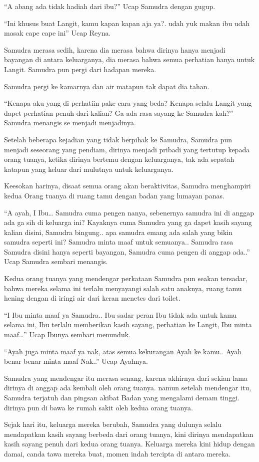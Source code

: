 “A abang ada tidak hadiah dari ibu?” Ucap Samudra dengan gugup.


“Ini khusus buat Langit, kamu kapan kapan aja ya?. udah yuk makan ibu udah masak cape cape ini” Ucap Reyna.


Samudra merasa sedih, karena dia merasa bahwa dirinya hanya menjadi bayangan di antara keluarganya, dia merasa bahwa semua perhatian hanya untuk Langit. Samudra pun pergi dari hadapan mereka.


Samudra pergi ke kamarnya dan air matapun tak dapat dia tahan.


“Kenapa aku yang di perhatiin pake cara yang beda? Kenapa selalu Langit yang dapet perhatian penuh dari kalian? Ga ada rasa sayang ke Samudra kah?” Samudra menangis se menjadi menjadinya.


Setelah beberapa kejadian yang tidak berpihak ke Samudra, Samudra pun menjadi seseorang yang pendiam, dirinya menjadi pribadi yang tertutup kepada orang tuanya, ketika dirinya bertemu dengan keluarganya, tak ada sepatah katapun yang keluar dari mulutnya untuk keluarganya.


Keesokan harinya, disaat semua orang akan beraktivitas, Samudra menghampiri kedua Orang tuanya di ruang tamu dengan badan yang lumayan panas.


“A ayah, I Ibu… Samudra cuma pengen nanya, sebenernya samudra ini di anggap ada ga sih di keluarga ini? Kayaknya cuma Samudra yang ga dapet kasih sayang kalian disini, Samudra bingung.. apa samudra emang ada salah yang bikin samudra seperti ini? Samudra minta maaf untuk semuanya.. Samudra rasa Samudra disini hanya seperti bayangan, Samudra cuma pengen di anggap ada..” Ucap Samudra sembari menangis.


Kedua orang tuanya yang mendengar perkataan Samudra pun seakan tersadar, bahwa mereka selama ini terlalu menyayangi salah satu anaknya, ruang tamu hening dengan di iringi air dari keran menetes dari toilet.


“I Ibu minta maaf ya Samudra.. Ibu sadar peran Ibu tidak ada untuk kamu selama ini, Ibu terlalu memberikan kasih sayang, perhatian ke Langit, Ibu minta maaf…” Ucap Ibunya sembari menunduk.


“Ayah juga minta maaf ya nak, atas semua kekurangan Ayah ke kamu.. Ayah benar benar minta maaf Nak..” Ucap Ayahnya.


Samudra yang mendengar itu merasa senang, karena akhirnya dari sekian lama dirinya di anggap ada kembali oleh orang tuanya. namun setelah mendengar itu, Samudra terjatuh dan pingsan akibat Badan yang mengalami demam tinggi. dirinya pun di bawa ke rumah sakit oleh kedua orang tuanya.


Sejak hari itu, keluarga mereka berubah, Samudra yang dulunya selalu mendapatkan kasih sayang berbeda dari orang tuanya, kini dirinya mendapatkan kasih sayang penuh dari kedua orang tuanya. Keluarga mereka kini hidup dengan damai, canda tawa mereka buat, momen indah tercipta di antara mereka. 

\jedahias
